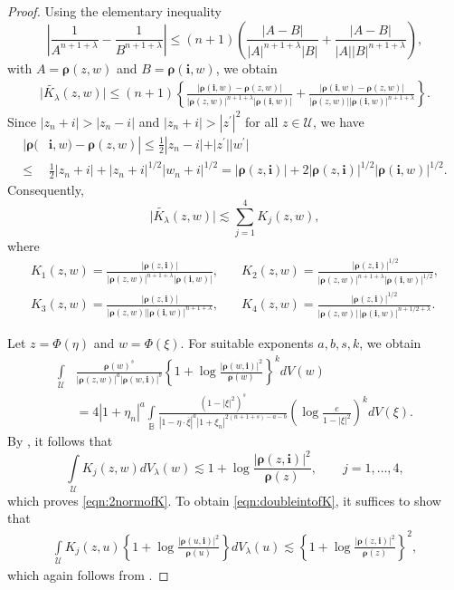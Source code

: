 \documentclass{amsart}
\numberwithin{equation}{section}
\newcommand{\ball}{\mathbb{B}}
\newcommand{\calU}{\mathcal{U}}
\newcommand{\bfi}{\mathbf{i}}
\newcommand{\bfrho}{\boldsymbol{\rho}}
\begin{document}
\begin{proof}
Using the elementary inequality
\begin{equation}\label{eq:em:K}
\left|\frac {1}{A^{n+1+\lambda}} - \frac {1}{B^{n+1+\lambda}} \right| \leq (n+1) \left( \frac {|A-B| } {|A|^{n+1+\lambda} |B|} + \frac {|A-B| }{|A||B|^{n+1+\lambda}} \right),
\end{equation}
with $A=\bfrho(z,w)$ and $B=\bfrho(\bfi,w)$, we obtain
\begin{align*}
\big|\widetilde{K_{\lambda}}(z,w)\big|\leq (n+1) \left\{ \frac {|\bfrho(\bfi,w)-\bfrho(z,w)|}{|\bfrho(z,w)|^{n+1+\lambda} |\bfrho(\bfi,w)|}
+ \frac {|\bfrho(\bfi,w)-\bfrho(z,w)|}{|\bfrho(z,w)| |\bfrho(\bfi,w)|^{n+1+\lambda} }\right\}.
\end{align*}
Since $|z_n+i| > |z_n-i|$ and $|z_n+i|> |z^{\prime}|^2$ for all $z\in \calU$, we have
\begin{align*}
|\bfrho(&\bfi,w)-\bfrho(z,w)| \leq \frac {1}{2} |z_n - i| + |z^{\prime}||w^{\prime}|\\
\leq& \frac {1}{2} |z_n + i| + |z_n+i|^{1/2} |w_n+i|^{1/2}
= |\bfrho(z,\bfi)| + 2 |\bfrho(z,\bfi)|^{1/2}  |\bfrho(\bfi,w)|^{1/2}.
\end{align*}
Consequently,
\begin{equation*}\label{eqn:Kmajor}
\big|\widetilde{K_{\lambda}}(z,w)\big|  \lesssim \sum_{j=1}^4  K_j(z,w),
\end{equation*}
where 
\begin{align*}
K_1(z,w) = \frac {|\bfrho(z,\bfi)|}{|\bfrho(z,w)|^{n+1+\lambda} |\bfrho(\bfi,w)|}, & \quad
K_2(z,w) =  \frac {|\bfrho(z,\bfi)|^{1/2}}{|\bfrho(z,w)|^{n+1+\lambda} |\bfrho(\bfi,w)|^{1/2}},\\
K_3(z,w) =  \frac {|\bfrho(z,\bfi)|}{|\bfrho(z,w)| |\bfrho(\bfi,w)|^{n+1+\lambda}}, & \quad
K_4(z,w) =  \frac {|\bfrho(z,\bfi)|^{1/2} } {|\bfrho(z,w)|\, |\bfrho(\bfi,w)|^{n+1/2+\lambda}}.
\end{align*}

Let $z=\Phi(\eta)$ and $w=\Phi(\xi)$. For suitable exponents $a,b,s,k$, we obtain
\begin{align*}
\int\limits_{\calU} &\frac{\bfrho(w)^{s}} {|\bfrho(z,w)|^{a} |\bfrho(w,\bfi)|^{b}}
\left\{1+\log \frac {|\bfrho(w,\bfi)|^2}{\bfrho(w)}\right\}^k dV(w)\\
&= 4|1+\eta_n|^{a} \int\limits_{\ball} \frac{(1-|\xi|^2)^{s}} {|1-\eta\cdot\overline{\xi}|^{a}
|1+\xi_n|^{2(n+1+s)-a-b}} \left(\log \frac {e}{1-|\xi|^2}\right)^k dV(\xi).
\end{align*}
By \cite[Theorem 3.1]{ZLSG18}, it follows that
\[
\int\limits_{\calU}  K_j (z,w)dV_\lambda(w) \lesssim
1 + \log \frac {|\bfrho(z,\bfi)|^2} {\bfrho(z)},\qquad j=1,\ldots,4,
\]
which proves \eqref{eqn:2normofK}.
To obtain \eqref{eqn:doubleintofK}, it suffices to show that
\begin{align*}
\int\limits_{\calU} K_j(z,u) \left\{1 + \log \frac {|\bfrho(u,\bfi)|^2} {\bfrho(u)}\right\} dV_\lambda(u)
\lesssim
\left\{1 + \log \frac {|\bfrho(z,\bfi)|^2} {\bfrho(z)}\right\}^2,
\end{align*}
which again follows from \cite[Theorem 3.1]{ZLSG18}.
\end{proof}
\end{document}
